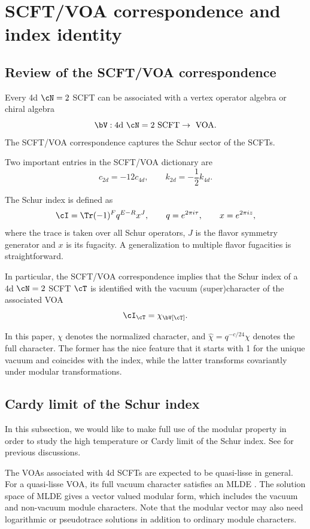 \documentclass[a4paper,11pt]{article}
\theoremstyle{definition}
\theoremstyle{definition}
\theoremstyle{remark}
\newcommand{\be}{\begin{equation}}
\newcommand{\ee}{\end{equation}}
\begin{document}
 \section{SCFT/VOA correspondence and index identity }\label{scftvoa}
 
 \subsection{Review of the SCFT/VOA correspondence     }
 
 Every 4d $\cN=2$ SCFT can be associated with a vertex operator  algebra or chiral algebra~\cite{Beem:2013sza}  
 \be
 \bV: \text{4d $\cN=2$ SCFT} \to \text{ VOA}.
 \ee
 The SCFT/VOA correspondence captures the Schur sector of the SCFTs. 
 
 Two  important  entries in the SCFT/VOA dictionary are 
     \be
c_{2d}=-12c_{4d}, \qquad k_{2d}=-\frac12k_{4d}.
 \ee

  The Schur index is defined as
  \be
\cI=\Tr(-1)^F q^{E-R}  x^{J}, \qquad q=e^{2\pi i \tau}, \qquad x=e^{2\pi i z},
\ee 
where the trace is taken over all Schur operators, $J$  is the flavor symmetry generator and    $x$ is its fugacity. A generalization to multiple flavor fugacities is straightforward. 

 
 
 
 
 
 In particular, the SCFT/VOA correspondence implies that  the Schur index
 of  a 4d $\cN=2$ SCFT $\cT$ is identified with the vacuum (super)character of the associated VOA~\cite{Beem:2013sza}  
 \be
 \cI_\cT=\chi_{\bV[\cT]}.
 \ee

 In this paper,    $\chi$   denotes the normalized character, and $\widehat \chi=q^{-c/24}\chi$   denotes the full character.   The former has the nice feature that it starts with 1 for the unique vacuum and coincides with the index, while the latter transforms  covariantly under modular transformations.  

\subsection{Cardy limit of the Schur index}

In this subsection, we would like to make full use of the modular property in order to study  the high temperature or Cardy limit of the Schur index. See \cite{Beem:2017ooy,ArabiArdehali:2023bpq} for previous discussions. 


 The VOAs associated with 4d SCFTs are expected to be quasi-lisse in general. For a quasi-lisse VOA, its full vacuum character satisfies an MLDE \cite{Arakawa:2016hkg,Beem:2017ooy}.  The solution space of MLDE gives a vector valued modular form, which includes the   vacuum   and  non-vacuum module characters. Note that the modular vector  may also need logarithmic or pseudotrace solutions in addition to ordinary module characters. 
\end{document}
